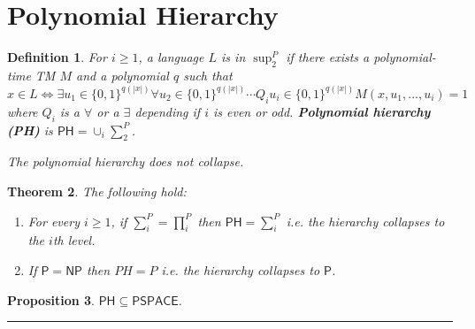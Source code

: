 \documentclass[twoside]{article}
\newcounter{lecnum}
\newtheorem{theorem}{Theorem}[lecnum]
\newtheorem{proposition}[theorem]{Proposition}
\newtheorem{definition}[theorem]{Definition}
\newenvironment{proof}{{\bf Proof:}}{\hfill\rule{2mm}{2mm}}
\def\P{\mathsf{P}}
\def\NP{\mathsf{NP}}
\def\PH{\mathsf{PH}}
\def\PSPACE{\mathsf{PSPACE}}
\begin{document}
\section{Polynomial Hierarchy}
\begin{definition}
For $i \geq 1$, a language $L$ is in $\sup^P_2$ if there exists a polynomial-time TM $M$ and a polynomial $q$ such that
\[x \in L \iff \exists u_1\in \{0,1\}^{q(|x|)} \forall u_2 \in 
\{0, 1\}^{q(|x|)} \cdots Q_i u_i \in \{0,1\}^{q(|x|)} M(x, u_1, ..., u_i) = 1\]
where $Q_i$ is a $\forall$ or a $\exists$ depending if $i$ is even or odd. \textbf{Polynomial hierarchy (PH)} is $\PH = \cup_{i} \sum^P_2$.
\end{definition}

\emph{The polynomial hierarchy does not collapse.}

\begin{theorem}
The following hold:
\begin{enumerate}
\item For every $i \geq 1$, if $\sum^P_i = \prod^P_i$ then $\PH = \sum^P_i$ i.e. the hierarchy collapses to the $i$th level.
\item If $\P = \NP$ then $PH = P$ i.e. the hierarchy collapses to $\P$. 
\end{enumerate}
\end{theorem}

\begin{proposition}
$\PH \subseteq \PSPACE$.
\end{proposition}
\begin{proof}

\end{proof}
\end{document}
